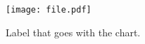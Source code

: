 \usepackage{graphicx}

\graphicspath{{~/figures/this_project/}}


\begin{figure}[!ht]
\centering
\caption{Label that goes with the chart.}
\texttt{[image: file.pdf]}
\label{fig:file}
\end{figure}


